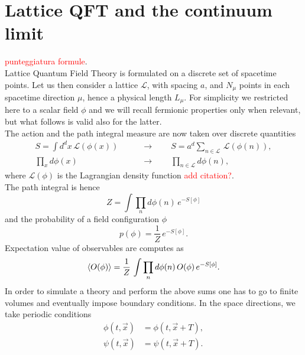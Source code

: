 \section{Lattice QFT and the continuum limit}
\label{sec:lattice_continuum_}
\textcolor{red}{punteggiatura formule}. \\
Lattice Quantum Field Theory is formulated on a discrete set of spacetime points. Let us then consider a lattice $\mathscr{L}$, with spacing $a$, and $N_\mu$ points in each spacetime direction $\mu$, hence a physical length $L_\mu$.
For simplicity we restricted here to a scalar field $\phi$ and we will recall fermionic properties only when relevant, but what follows is valid also for the latter. \\ 
The action and the path integral measure are now taken over discrete quantities 
\begin{equation*}
    \begin{aligned}
	    S = \int d^dx \, \mathcal{L}(\phi(x)) \qquad &\to \qquad S = a^d \sum_{n \in \mathscr{L}} \, \mathcal{L}(\phi(n)), \\
        \prod_{x} d\phi(x) \qquad &\to  \qquad \prod_{n \in \mathscr{L}} d\phi(n),
    \end{aligned}
\end{equation*}
where $\mathcal{L}(\phi)$ is the Lagrangian density function \textcolor{red}{add citation?}.  \\
The path integral is hence
\begin{equation*}
    Z = \int \prod_n d\phi(n) \, e^{-S[\phi]}
\end{equation*}
and the probability of a field configuration $\phi$
\begin{equation}
    p(\phi) = \frac{1}{Z} \, e^{-S[\phi]}.
    \label{eq:probability_distribution_lattice}
\end{equation}
Expectation value of observables are computes as
\begin{equation}
    \left\langle O(\phi) \right\rangle  = \frac{1}{Z} \, \int \prod_n d\phi(n) \, O(\phi) \, e^{-S[\phi]}.
    \label{eq:expectation_value_lattice}
\end{equation}
In order to simulate a theory and perform the above sums one has to go to finite volumes and eventually impose boundary conditions. In the space directions, we take periodic conditions 
\begin{equation*}
    \begin{aligned}
        \phi(t, \vec x) &= \phi(t, \vec x + T), \\
        \psi(t, \vec x) &= \psi(t, \vec x + T).
    \end{aligned}
\end{equation*}
